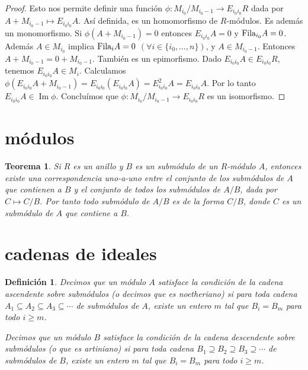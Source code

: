 \documentclass{report}
\newcommand{\Fila}{\textnormal{Fila}}
\DeclareMathOperator{\image}{\text{Im}}
\newtheorem{theorem}{Teorema}
\newtheorem{definition}{Definición}
\begin{document}
\begin{proof}
    Esto nos permite definir una función \(\phi : M_{i_0} / M_{i_0 - 1} \rightarrow E_{i_0 i_0} R\) dada por \(A + M_{i_0 - 1} \mapsto E_{i_0 i_0} A\).
    Así definida, es un homomorfismo de \(R\)-módulos.
    Es además un monomorfismo.
    Si \(\phi(A + M_{i_0 - 1}) = 0\) entonces \(E_{i_0 i_0} A = 0\) y \(\Fila_{i_0} A = 0\).
    Además \(A \in M_{i_0}\) implica \(\Fila_i A = 0\) \((\forall i \in \{i_0, \dots, n\})\), y \(A \in M_{i_0 - 1}\).
    Entonces \(A + M_{i_0 - 1} = 0 + M_{i_0 - 1}\).
    También es un epimorfismo.
    Dado \(E_{i_0 i_0} A \in E_{i_0 i_0} R\), tenemos \(E_{i_0 i_0} A \in M_i\).
    Calculamos \(\phi(E_{i_0 i_0} A + M_{i_0 - 1}) = E_{i_0 i_0} (E_{i_0 i_0} A) = E_{i_0 i_0}^2 A = E_{i_0 i_0} A\).
    Por lo tanto \(E_{i_0 i_0} A \in \image \phi\).
    Concluímos que \(\phi : M_{i_0} / M_{i_0 - 1} \rightarrow E_{i_0 i_0} R\) es un isomorfismo.
  \end{proof}

  \section{módulos}
  \begin{theorem}
    \label{theorem:submodulesOfQuotientModule}
    Si \(R\) es un anillo y \(B\) es un submódulo de un \(R\)-módulo \(A\), entonces existe una correspondencia uno-a-uno entre el conjunto de los submódulos de \(A\) que contienen a \(B\) y el conjunto de todos los submódulos de \(A / B\), dada por \(C \mapsto C / B\).
    Por tanto todo submódulo de \(A / B\) es de la forma \(C / B\), donde \(C\) es un submódulo de \(A\) que contiene a \(B\).
  \end{theorem}


  \section{cadenas de ideales}

  \begin{definition}
    Decimos que un módulo \(A\) satisface la \emph{condición de la cadena ascendente sobre submódulos} (o decimos que es \emph{noetheriano}) si para toda cadena \(A_1 \subseteq A_2 \subseteq A_3 \subseteq \cdots\) de submódulos de \(A\), existe un entero \(m\) tal que \(B_i = B_m\) para todo \(i \geq m\).

    Decimos que un módulo \(B\) satisface la \emph{condición de la cadena descendente sobre submódulos} (o que es \emph{artiniano}) si para toda cadena \(B_1 \supseteq B_2 \supseteq B_3 \supseteq \cdots\) de submódulos de \(B\), existe un entero \(m\) tal que \(B_i = B_m\) para todo \(i \geq m\).
  \end{definition}
\end{document}
